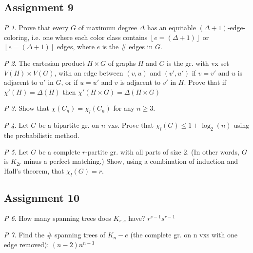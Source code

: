 \documentclass[11pt, fleqn, a4paper, landscape]{article}
\theoremstyle{plain} %
\theoremstyle{remark} %
\newtheorem{problem}{P}
\theoremstyle{definition} %
\begin{document}
\begin{multicols}{5}
\subsection{Assignment 9}

\begin{problem}
Prove that every $G$ of maximum degree $\Delta$ has an equitable $(\Delta + 1)$-edge-coloring, i.e. one where each color class contains $\left\lfloor e=(\Delta + 1)\right\rfloor$ or $\left\lfloor e=(\Delta + 1)\right\rfloor$ edges, where $e$ is the \# edges in $G$.
\end{problem}

\begin{problem}
The cartesian product $H \times G $ of graphs $H$ and $G$ is the gr. with vx set $V (H)\times V (G)$, with an edge between $(v, u)$ and $(v', u')$ if $v = v'$ and $u$ is adjacent to $u'$ in $G$, or
if $u = u'$ and $v$ is adjacent to $v'$ in $H$. Prove that if $\chi'(H) = \Delta(H)$ then $\chi'(H\times G) = \Delta(H\times G)$
\end{problem}

\begin{problem}
Show that $\chi(C_n) = \chi_l(C_n)$ for any $n \ge 3$.
\end{problem}

\begin{problem}
Let $G$ be a bipartite gr. on $n$ vxs. Prove that $\chi_l(G)\le 1 + \log_2(n)$ using the probabilistic method.
\end{problem}

\begin{problem}
Let $G$ be a complete $r$-partite gr. with all parts of size 2. (In other words, $G$ is $K_{2r}$ minus a perfect matching.) Show, using a combination of induction and Hall's theorem, that $\chi_l(G) = r$.
\end{problem}

\subsection{Assignment 10}

\begin{problem}
How many spanning trees does $K_{r,s}$ have? $r^{s-1}s^{r-1}$
\end{problem}

\begin{problem}
Find the \# spanning trees of $K_n- e$ (the complete gr. on n vxs with one edge removed): $(n-2)n^{n-3}$
\end{problem}


\end{multicols}
\end{document}
